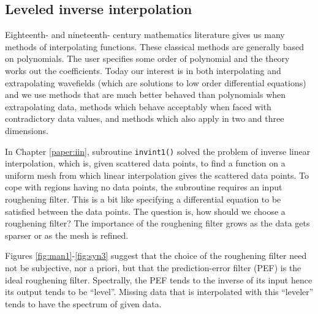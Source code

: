 \subsection{Leveled inverse interpolation}
Eighteenth- and nineteenth- century mathematics literature gives us
many methods of interpolating functions.
These classical methods are generally based on polynomials.
The user specifies some order of polynomial
and the theory works out the coefficients.
Today our interest is in both interpolating and extrapolating wavefields
(which are solutions to low order differential equations)
and we use methods that
are much better behaved than polynomials when extrapolating data,
methods which behave acceptably when faced with contradictory data values,
and methods which also apply in two and three dimensions.
\par
In Chapter \ref{paper:iin},
subroutine \texttt{invint1()} 
solved the problem of inverse linear interpolation,
which is,
given scattered data points,
to find a function on a uniform mesh
from which linear interpolation gives the scattered data points.
To cope with regions having no data points,
the subroutine requires an input roughening filter.
This is a bit like specifying a differential equation
to be satisfied between the data points.
The question is, how should we choose a roughening filter?
The importance of the roughening filter
grows as the data gets sparser or as the mesh is refined.
\par
Figures \ref{fig:man1}-\ref{fig:syn3} suggest that the choice
of the roughening filter need not be subjective,
nor a priori,
but that the prediction-error filter (PEF) is the ideal roughening filter.
Spectrally, the PEF tends to the inverse of its input
hence its output tends to be ``level''.
Missing data that is interpolated with this ``leveler''
tends to have the spectrum of given data.
%
%
